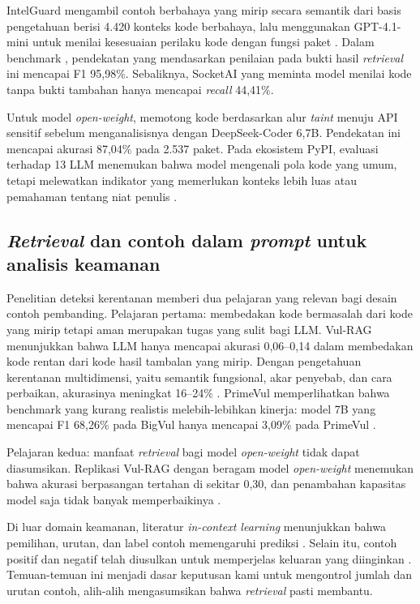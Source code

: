 \documentclass[a4paper,fleqn]{cas-dc}
\begin{document}
IntelGuard mengambil contoh berbahaya yang mirip secara semantik dari basis
pengetahuan berisi 4.420 konteks kode berbahaya, lalu menggunakan GPT-4.1-mini
untuk menilai kesesuaian perilaku kode dengan fungsi paket
\citep{guo2026bridging}. Dalam benchmark \citet{guo2026effective}, pendekatan
yang mendasarkan penilaian pada bukti hasil \emph{retrieval} ini mencapai F1
95,98\%. Sebaliknya, SocketAI yang meminta model menilai kode tanpa bukti
tambahan hanya mencapai \emph{recall} 44,41\%.

Untuk model \emph{open-weight}, \citet{nguyen2025taint} memotong kode berdasarkan
alur \emph{taint} menuju API sensitif sebelum menganalisisnya dengan
DeepSeek-Coder 6,7B. Pendekatan ini mencapai akurasi 87,04\% pada 2.537 paket.
Pada ekosistem PyPI, evaluasi terhadap 13 LLM menemukan bahwa model mengenali
pola kode yang umum, tetapi melewatkan indikator yang memerlukan konteks lebih
luas atau pemahaman tentang niat penulis \citep{ryan2026evaluation}.

\subsection{\emph{Retrieval} dan contoh dalam \emph{prompt} untuk analisis keamanan}

Penelitian deteksi kerentanan memberi dua pelajaran yang relevan bagi desain
contoh pembanding. Pelajaran pertama: membedakan kode bermasalah dari kode yang
mirip tetapi aman merupakan tugas yang sulit bagi LLM. Vul-RAG menunjukkan bahwa
LLM hanya mencapai akurasi 0,06--0,14 dalam membedakan kode rentan dari kode
hasil tambalan yang mirip. Dengan pengetahuan kerentanan multidimensi, yaitu
semantik fungsional, akar penyebab, dan cara perbaikan, akurasinya meningkat
16--24\% \citep{du2026vulrag}. PrimeVul memperlihatkan bahwa benchmark yang kurang
realistis melebih-lebihkan kinerja: model 7B yang mencapai F1 68,26\% pada BigVul
hanya mencapai 3,09\% pada PrimeVul \citep{ding2025vulnerability}.

Pelajaran kedua: manfaat \emph{retrieval} bagi model \emph{open-weight} tidak
dapat diasumsikan. Replikasi Vul-RAG dengan beragam model \emph{open-weight}
menemukan bahwa akurasi berpasangan tertahan di sekitar 0,30, dan penambahan
kapasitas model saja tidak banyak memperbaikinya \citep{kaniewski2026revisiting}.

Di luar domain keamanan, literatur \emph{in-context learning} menunjukkan bahwa
pemilihan, urutan, dan label contoh memengaruhi prediksi
\citep{liu2022makes,zhao2021calibrate,min2022rethinking}. Selain itu, contoh
positif dan negatif telah diusulkan untuk memperjelas keluaran yang diinginkan
\citep{gao2024customizing}. Temuan-temuan ini menjadi dasar keputusan kami untuk
mengontrol jumlah dan urutan contoh, alih-alih mengasumsikan bahwa
\emph{retrieval} pasti membantu.
\end{document}
